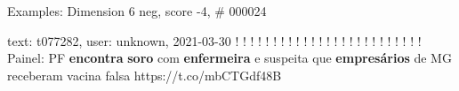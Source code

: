 \begin{frame}{Examples: Dimension 6 neg, score -4, \# 000024}
\footnotesize
\begin{alertblock}{text: t077282, user: unknown, 2021-03-30}
! ! ! ! ! ! ! ! ! ! ! ! ! ! ! ! ! ! ! ! ! ! ! ! ! Painel: PF \textbf{encontra} 
\textbf{soro} com \textbf{enfermeira} e suspeita que \textbf{empresários} de MG 
receberam vacina falsa https://t.co/mbCTGdf48B 
\end{alertblock}
\end{frame}
